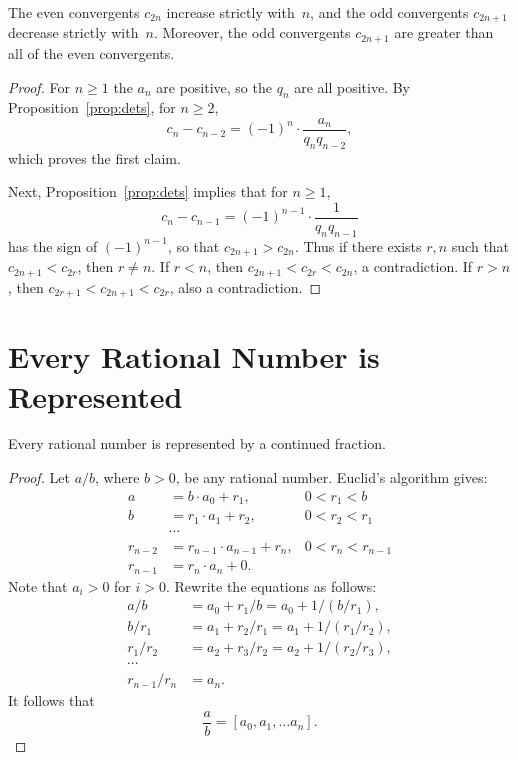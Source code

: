 \documentclass[11pt]{report}
\begin{document}
\begin{proposition}
  The even convergents $c_{2n}$ increase strictly with~$n$, and the
  odd convergents $c_{2n+1}$ decrease strictly with~$n$.  Moreover,
  the odd convergents $c_{2n+1}$ are greater than all of the
  even convergents.
\end{proposition}
\begin{proof}
  For $n\geq 1$ the $a_n$ are positive, so the $q_n$ are all positive.
  By Proposition~\ref{prop:dets}, for $n\geq 2$,
  $$c_n - c_{n-2} = (-1)^n \cdot \frac{a_n}{q_n q_{n-2} },$$
  which proves the first claim.

  Next, Proposition~\ref{prop:dets} implies that for $n\geq 1$,
  $$
    c_n - c_{n-1} = (-1)^{n-1}\cdot \frac{1}{q_n q_{n-1}}
  $$
  has the sign of $(-1)^{n-1}$, so that
  $c_{2n+1} > c_{2n}$.
  Thus if there exists $r, n$ such that
  $c_{2n+1} < c_{2r}$, then $r\neq n$.
  If $r<n$, then $c_{2n+1} < c_{2r} < c_{2n}$, a contradiction.
  If $r>n$, then $c_{2r+1} < c_{2n+1} < c_{2r}$, also a contradiction.
\end{proof}

\section{Every Rational Number is Represented}
\begin{proposition}
  Every rational number is represented by
  a continued fraction.
\end{proposition}
\begin{proof}
  Let $a/b$, where $b>0$, be any rational number.  Euclid's
  algorithm gives:
  \begin{align*}
    a       & = b\cdot a_0 + r_1,           & 0<r_1<b         \\
    b       & = r_1\cdot a_1 + r_2,         & 0<r_2<r_1       \\
            & \cdots                        &                 \\
    r_{n-2} & = r_{n-1}\cdot a_{n-1} + r_n, & 0<r_n < r_{n-1} \\
    r_{n-1} & = r_n\cdot a_n + 0.
  \end{align*}
  Note that $a_i>0$ for $i>0$.
  Rewrite the equations as follows:
  \begin{align*}
    a/b         & = a_0 + r_1/b = a_0 + 1/(b/r_1),       \\
    b/r_1       & = a_1 + r_2 / r_1 = a_1 + 1/(r_1/r_2), \\
    r_1/r_2     & = a_2 + r_3 / r_2 = a_2 + 1/(r_2/r_3), \\
    \cdots                                               \\
    r_{n-1}/r_n & = a_n.
  \end{align*}
  It follows that
  $$
    \frac{a}{b} = [a_0,a_1,\ldots a_n].
  $$


\end{proof}
\end{document}
